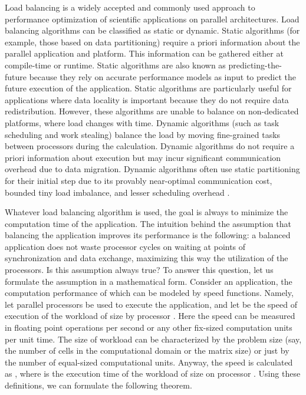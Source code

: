 \documentclass{acm_proc_article-sp}
\begin{document}
Load balancing is a widely accepted and commonly used approach to performance optimization of scientific applications on parallel architectures. Load balancing algorithms can be classified as static or dynamic. Static algorithms (for example, those based on data partitioning) \cite{Fatica2009, Yang2010, Ogata2008, ijhpca2007} require a priori information about the parallel application and platform. This information can be gathered either at compile-time or runtime. Static algorithms are also known as predicting-the-future because they rely on accurate performance models as input to predict the future execution of the application. Static algorithms are particularly useful for applications where data locality is important because they do not require data redistribution. However, these algorithms are unable to balance on non-dedicated platforms, where load changes with time. Dynamic algorithms (such as task scheduling and work stealing) \cite{Linderman2008, Augonnet2009, QuintanaOrti2009} balance the load by moving fine-grained tasks between processors during the calculation. Dynamic algorithms do not require a priori information about execution but may incur significant communication overhead due to data migration. Dynamic algorithms often use static partitioning for their initial step due to its provably near-optimal communication cost, bounded tiny load imbalance, and lesser scheduling overhead \cite{Song2012}. 

Whatever load balancing algorithm is used, the goal is always to minimize the computation time of the application. The intuition behind the assumption that balancing the application improves its performance is the following: a balanced application does not waste processor cycles on waiting at points of synchronization and data exchange, maximizing this way the utilization of the processors. Is this assumption always true? To answer this question, let us formulate the assumption in a mathematical form. Consider an application, the computation performance of which can be modeled by speed functions. Namely, let  parallel processors be used to execute the application, and let  be the speed of execution of the workload of size  by processor . Here the speed can be measured in floating point operations per second or any other fix-sized computation units per unit time. The size of workload can be characterized by the problem size (say, the number of cells in the computational domain or the matrix size) or just by the number of equal-sized computational units. Anyway, the speed  is calculated as , where  is the execution time of the workload of size  on processor . Using these definitions, we can formulate the following theorem.
\end{document}
